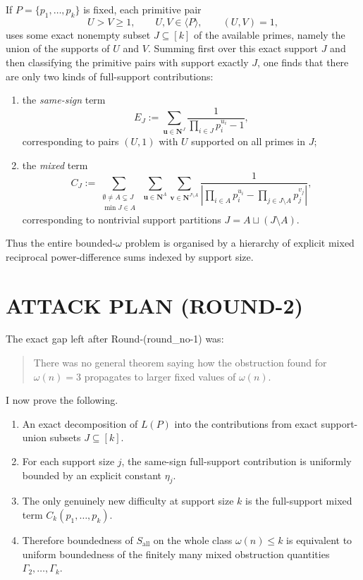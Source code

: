 If \(P=\{p_1,\dots,p_k\}\) is fixed, each primitive pair
\[
U>V\ge 1,
\qquad U,V\in\langle P\rangle,
\qquad (U,V)=1,
\]
uses some exact nonempty subset \(J\subseteq [k]\) of the available primes, namely the union of the supports of \(U\) and \(V\). Summing first over this exact support \(J\) and then classifying the primitive pairs with support exactly \(J\), one finds that there are only two kinds of full-support contributions:
\begin{enumerate}
\item the \emph{same-sign} term
\[
E_J:=\sum_{\mathbf u\in\mathbf N^{J}}\frac{1}{\prod_{i\in J}p_i^{u_i}-1},
\]
corresponding to pairs \((U,1)\) with \(U\) supported on all primes in \(J\);
\item the \emph{mixed} term
\[
C_J:=
\sum_{\substack{\emptyset\neq A\subsetneq J\\ \min J\in A}}
\ 
\sum_{\mathbf u\in\mathbf N^{A}}
\sum_{\mathbf v\in\mathbf N^{J\setminus A}}
\frac{1}{\left|\prod_{i\in A}p_i^{u_i}-\prod_{j\in J\setminus A}p_j^{v_j}\right|},
\]
corresponding to nontrivial support partitions \(J=A\sqcup (J\setminus A)\).
\end{enumerate}

Thus the entire bounded-\(\omega\) problem is organised by a hierarchy of explicit mixed reciprocal power-difference sums indexed by support size.

\section{ATTACK PLAN (ROUND-2)}

The exact gap left after Round-(round\_no-1) was:

\begin{quote}
There was no general theorem saying how the obstruction found for \(\omega(n)=3\) propagates to larger fixed values of \(\omega(n)\).
\end{quote}

I now prove the following.

\begin{enumerate}
\item An exact decomposition of \(L(P)\) into the contributions from exact support-union subsets \(J\subseteq [k]\).
\item For each support size \(j\), the same-sign full-support contribution is uniformly bounded by an explicit constant \(\eta_j\).
\item The only genuinely new difficulty at support size \(k\) is the full-support mixed term \(C_k(p_1,\dots,p_k)\).
\item Therefore boundedness of \(S_{\mathrm{all}}\) on the whole class \(\omega(n)\le k\) is equivalent to uniform boundedness of the finitely many mixed obstruction quantities \(\Gamma_2,\dots,\Gamma_k\).
\end{enumerate}

